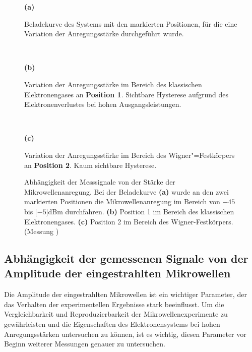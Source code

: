 \begin{figure}[h!tbp]
    \begin{center}
    \begin{minipage}[b]{5cm}{\bfseries (a)}\par Beladekurve des Systems mit den markierten Positionen, für die eine Variation der Anregungsstärke durchgeführt wurde.
    \end{minipage}\\
    \begin{minipage}[b]{5cm}{\bfseries (b)}\par Variation der Anregungsstärke im Bereich des klassischen Elektronengases an {\bfseries Position 1}. Sichtbare Hysterese aufgrund des Elektronenverlustes bei hohen Ausgangsleistungen.
    \end{minipage}\\
    \begin{minipage}[b]{5cm}{\bfseries (c)}\par Variation der Anregungsstärke im Bereich des Wigner"=Festkörpers an {\bfseries Position 2}. Kaum sichtbare Hysterese.
    \end{minipage}
    \end{center}
    \caption[Variation der Mikrowellenamplitude]{Abhängigkeit der Messsignale von der Stärke der Mikrowellenanregung. Bei der Beladekurve {\bfseries (a)} wurde an den zwei markierten Positionen die Mikrowellenanregung im Bereich von $-45$ bis \unit[$-5$]{dBm} durchfahren. {\bfseries (b)} Position 1 im Bereich des klassischen Elektronengases. {\bfseries (c)} Position 2 im Bereich des Wigner-Festkörpers. (Messung )}
    \label{fig:powerdep}
\end{figure}

\subsection{Abhängigkeit der gemessenen Signale von der Amplitude der eingestrahlten Mikrowellen}
Die Amplitude der eingestrahlten Mikrowellen ist ein wichtiger Parameter, der das Verhalten der experimentellen Ergebnisse stark beeinflusst. Um die Vergleichbarkeit und Reproduzierbarkeit der Mikrowellenexperimente zu gewährleisten und die Eigenschaften des Elektronensystems bei hohen Anregungsstärken untersuchen zu können, ist es wichtig, diesen Parameter vor Beginn weiterer Messungen genauer zu untersuchen.

